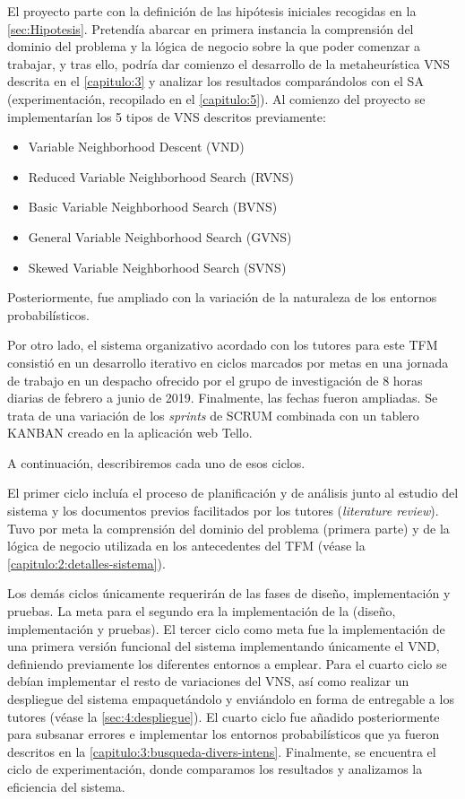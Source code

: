 El proyecto parte con la definición de las hipótesis iniciales recogidas en la \autoref{sec:Hipotesis}. 
Pretendía abarcar en primera instancia la comprensión del dominio del problema y la lógica de negocio sobre la que poder comenzar a trabajar, y tras ello, podría dar comienzo el desarrollo de la metaheurística VNS descrita en el \autoref{capitulo:3} y analizar los resultados comparándolos con el SA (experimentación, recopilado en el \autoref{capitulo:5}). Al comienzo del proyecto se implementarían los 5 tipos de VNS descritos previamente:
\begin{itemize}
	\item Variable Neighborhood Descent (VND)
	\item Reduced Variable Neighborhood Search (RVNS)
	\item Basic Variable Neighborhood Search (BVNS)
	\item General Variable Neighborhood Search (GVNS)
	\item Skewed Variable Neighborhood Search (SVNS)
\end{itemize}

Posteriormente, fue ampliado con la variación de la naturaleza de los entornos probabilísticos.

Por otro lado, el sistema organizativo acordado con los tutores para este TFM consistió en un desarrollo iterativo en ciclos marcados por metas en una jornada de trabajo en un despacho ofrecido por el grupo de investigación de 8 horas diarias de febrero a junio de 2019. Finalmente, las fechas fueron ampliadas. Se trata de una variación de los \textit{sprints} de SCRUM combinada con un tablero KANBAN creado en la aplicación web Tello. 

A continuación, describiremos cada uno de esos ciclos.

El primer ciclo incluía el proceso de planificación y de análisis junto al estudio del sistema y los documentos previos facilitados por los tutores (\textit{literature review}). Tuvo por meta la comprensión del dominio del problema (primera parte) y de la lógica de negocio utilizada en los antecedentes del TFM (véase la \autoref{capitulo:2:detalles-sistema}).

Los demás ciclos únicamente requerirán de las fases de diseño, implementación y pruebas. La meta para el segundo era la implementación de la \faseuno{} (diseño, implementación y pruebas). El tercer ciclo como meta fue la implementación de una primera versión funcional del sistema implementando únicamente el VND, definiendo previamente los diferentes entornos a emplear. Para el cuarto ciclo se debían implementar el resto de variaciones del VNS, así como realizar un despliegue del sistema empaquetándolo y enviándolo en forma de entregable a los tutores (véase la \autoref{sec:4:despliegue}). El cuarto ciclo fue añadido posteriormente para subsanar errores e implementar los entornos probabilísticos que ya fueron descritos en la \autoref{capitulo:3:busqueda-divers-intens}. Finalmente, se encuentra el ciclo de experimentación, donde comparamos los resultados y analizamos la eficiencia del sistema.

